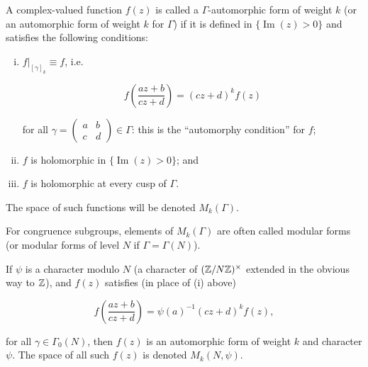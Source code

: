 \begin{definition}\label{def:1.1}

A complex-valued function $f(z)$ is called a $\Gamma$-automorphic form of weight $k$ (or an automorphic form of weight $k$ for $\Gamma$) if it is defined in $\{\operatorname{Im}(z) > 0\}$ and satisfies the following conditions:

\begin{enumerate}[(i)]

\item $f\big|_{[\gamma]_k} \equiv f$, i.e.

\[
f\!\left(\frac{az + b}{cz + d}\right) = (cz + d)^k f(z)
\]

for all $\gamma = \begin{pmatrix} a & b \\ c & d \end{pmatrix} \in \Gamma$: this is the ``automorphy condition'' for $f$;

\item $f$ is holomorphic in $\{\operatorname{Im}(z) > 0\}$; and

\item $f$ is holomorphic at every cusp of $\Gamma$.

\end{enumerate}

The space of such functions will be denoted $M_k(\Gamma)$.

\end{definition}

For congruence subgroups, elements of $M_k(\Gamma)$ are often called modular forms (or modular forms of level $N$ if $\Gamma = \Gamma(N)$).

If $\psi$ is a character modulo $N$ (a character of $(\mathbb{Z}/N\mathbb{Z})^{\times}$ extended in the obvious way to $\mathbb{Z}$), and $f(z)$ satisfies (in place of (i) above)

\[
f\!\left(\frac{az + b}{cz + d}\right) = \psi(a)^{-1}(cz + d)^k f(z),
\]

for all $\gamma \in \Gamma_0(N)$, then $f(z)$ is an automorphic form of weight $k$ and character $\psi$. The space of all such $f(z)$ is denoted $M_k(N, \psi)$.

